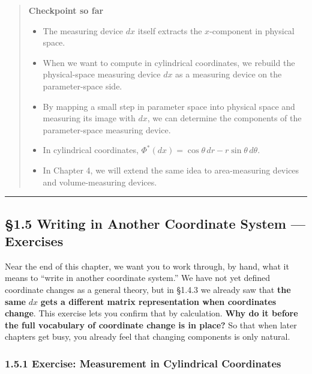 \begin{quote}
\textbf{Checkpoint so far}

\begin{itemize}
\item
  The measuring device \(dx\) itself extracts the \(x\)-component in
  physical space.
\item
  When we want to compute in cylindrical coordinates, we rebuild the
  physical-space measuring device \(dx\) as a measuring device on the
  parameter-space side.
\item
  By mapping a small step in parameter space into physical space and
  measuring its image with \(dx\), we can determine the components of
  the parameter-space measuring device.
\item
  In cylindrical coordinates,
  \(\Phi^*(dx)=\cos\theta\,dr-r\sin\theta\,d\theta\).
\item
  In Chapter 4, we will extend the same idea to area-measuring devices
  and volume-measuring devices.
\end{itemize}
\end{quote}

\begin{center}\rule{0.5\linewidth}{0.5pt}\end{center}

\hypertarget{writing-in-another-coordinate-system-exercises}{%
\subsection{§1.5 Writing in Another Coordinate System ---
Exercises}\label{writing-in-another-coordinate-system-exercises}}

Near the end of this chapter, we want you to work through, by hand, what
it means to ``write in another coordinate system.'' We have not yet
defined coordinate changes as a general theory, but in §1.4.3 we already
saw that \textbf{the same} \(dx\) \textbf{gets a different matrix
representation when coordinates change}. This exercise lets you confirm
that by calculation. \textbf{Why do it before the full vocabulary of
coordinate change is in place?} So that when later chapters get busy,
you already feel that changing components is only natural.

\hypertarget{exercise-measurement-in-cylindrical-coordinates}{%
\subsubsection{1.5.1 Exercise: Measurement in Cylindrical
Coordinates}\label{exercise-measurement-in-cylindrical-coordinates}}

